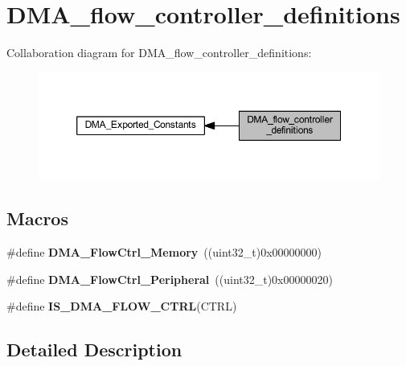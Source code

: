 \hypertarget{group___d_m_a__flow__controller__definitions}{}\section{D\+M\+A\+\_\+flow\+\_\+controller\+\_\+definitions}
\label{group___d_m_a__flow__controller__definitions}
Collaboration diagram for D\+M\+A\+\_\+flow\+\_\+controller\+\_\+definitions\+:
\nopagebreak
\begin{figure}[H]
\begin{center}
\leavevmode
\includegraphics[width=350pt]{group___d_m_a__flow__controller__definitions}
\end{center}
\end{figure}
\subsection*{Macros}
\begin{DoxyCompactItemize}
\item 
\mbox{\label{group___d_m_a__flow__controller__definitions_gafe69109789c2c285f98193f4b598cbc1}} 
\#define {\bfseries D\+M\+A\+\_\+\+Flow\+Ctrl\+\_\+\+Memory}~((uint32\+\_\+t)0x00000000)
\item 
\mbox{\label{group___d_m_a__flow__controller__definitions_ga33a735d51a2b790a25c579753edddd46}} 
\#define {\bfseries D\+M\+A\+\_\+\+Flow\+Ctrl\+\_\+\+Peripheral}~((uint32\+\_\+t)0x00000020)
\item 
\#define {\bfseries I\+S\+\_\+\+D\+M\+A\+\_\+\+F\+L\+O\+W\+\_\+\+C\+T\+RL}(C\+T\+RL)
\end{DoxyCompactItemize}


\subsection{Detailed Description}


